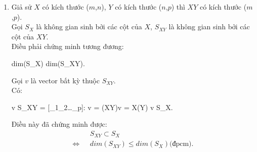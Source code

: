 \documentclass{article}
\begin{document}
\begin{enumerate}[label=(\alph*)]
\item 
Giả sử $X$ có kích thước ($m$,$n$), $Y$ có kích thước ($n$,$p$) thì $XY$ có kích thước ($m$,$p$).\\
Gọi $S_X$ là không gian sinh bởi các cột của $X$, $S_{XY}$ là không gian sinh bởi các cột của $XY$.\\
Điều phải chứng minh tương đương: 
\begin{center}
    dim(S_X) \geq dim(S_{XY}).\\
\end{center}
Gọi $v$ là vector bất kỳ thuộc $S_{XY}$.\\
Có: 
\begin{center}
    v \in S_{XY} \Rightarrow \exists \lambda = [\lambda_1\space\lambda_2\dots\lambda_p]: v = (XY)\lambda \Leftrightarrow v = X(Y\lambda) \Leftrightarrow v \in S_X. \\
\end{center}
 Điều này đã chứng minh được:
 \begin{align*}
     & S_{XY} \subset S_X \\
     \Leftrightarrow \text{   } & dim(S_{XY}) \leq dim(S_X) \text{(đpcm).}
 \end{align*} 
   

\end{enumerate}
\end{document}
